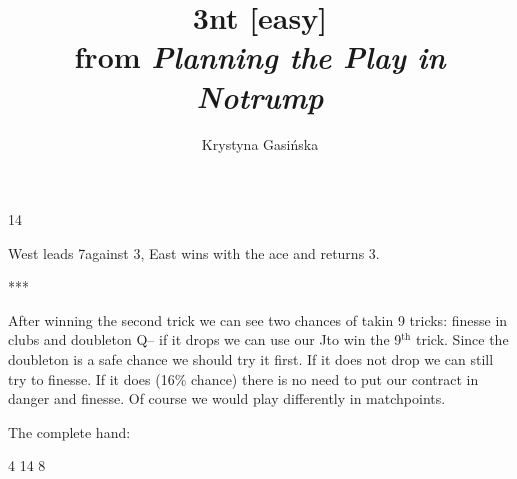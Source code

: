\documentclass[12pt, a4paper]{article}
\title{3nt [easy]\\\vspace{0.3cm}\normalsize{from \textit{Planning the Play in Notrump}}}
\author{Krystyna Gasińska}
\begin{document}
\maketitle

        {}{}
        {}{14}
        {}{}
        {}

West leads 7\spades against 3\nt, East 
wins with the ace and returns 3\spades.
\begin{center}
    ***
\end{center}
After winning the second trick we can see two chances
of takin 9 tricks: finesse in clubs and doubleton 
Q\diams -- if it drops we can use our J\diams to win
the 9$^{\text{th}}$ trick. Since the doubleton is a
safe chance
we should try it first.
If it does not drop we can still try to finesse.
If it does (16\% chance) there is no need to put
our contract in danger and finesse. Of course we would
play differently in matchpoints.

\vspace{0.2cm}

The complete hand:

        {}{4}
        {}{14}
        {}{8}
        {}
\end{document}
